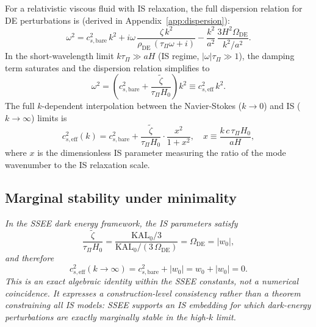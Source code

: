 \documentclass[12pt,a4paper]{article}
\newcommand{\KALz}{\mathrm{KAL}_0}
\newcommand{\wz}{w_0}
\newcommand{\OmDE}{\Omega_{\mathrm{DE}}}
\newcommand{\tauPi}{\tau_\Pi}
\newcommand{\ztilde}{\tilde{\zeta}}
\begin{document}
For a relativistic viscous fluid with IS relaxation, the full dispersion relation
for DE perturbations is (derived in Appendix~\ref{app:dispersion}):
\begin{equation}
  \omega^2 = c^2_{s,\mathrm{bare}}\,k^2
    + i\omega\,\frac{\zeta\,k^2}{\rho_{\mathrm{DE}}\,(\tauPi\omega + i)}
    - \frac{k^2}{a^2}\,\frac{3H^2\OmDE}{k^2/a^2}.
  \label{eq:disprel_full}
\end{equation}
In the short-wavelength limit $k\tauPi \gg aH$ (IS regime,
$|\omega|\tauPi \gg 1$), the damping term saturates and the dispersion relation
simplifies to
\begin{equation}
  \omega^2 = \left(c^2_{s,\mathrm{bare}} + \frac{\ztilde}{\tauPi H_0}\right)k^2
  \equiv c^2_{s,\mathrm{eff}}\,k^2.
  \label{eq:cs2_eff_def}
\end{equation}
The full $k$-dependent interpolation between the Navier-Stokes ($k\to 0$) and
IS ($k\to\infty$) limits is
\begin{equation}
  c^2_{s,\mathrm{eff}}(k) = c^2_{s,\mathrm{bare}}
  + \frac{\ztilde}{\tauPi H_0}\cdot\frac{x^2}{1+x^2},
  \quad x \equiv \frac{k\,c\,\tauPi H_0}{aH},
  \label{eq:cs2full}
\end{equation}
where $x$ is the dimensionless IS parameter measuring the ratio of the mode
wavenumber to the IS relaxation scale.

\subsection{Marginal stability under minimality}
\label{subsec:identity}

\begin{tcolorbox}[colback=blue!5!white,colframe=blue!60!black,title={\textbf{SSEE Marginal Stability (given minimality)}}]
\textit{In the SSEE dark energy framework, the IS parameters satisfy}
\begin{equation}
  \frac{\ztilde}{\tauPi H_0}
  = \frac{\KALz/3}{\KALz/(3\,\OmDE)}
  = \OmDE = |\wz|,
\end{equation}
\textit{and therefore}
\begin{equation}
  c^2_{s,\mathrm{eff}}(k\to\infty)
    = c^2_{s,\mathrm{bare}} + |\wz|
    = \wz + |\wz| = 0.
\end{equation}
\textit{This is an exact algebraic identity within the SSEE constants, not a
numerical coincidence. It expresses a construction-level consistency rather
than a theorem constraining all IS models: SSEE supports an IS embedding for
which dark-energy perturbations are exactly marginally stable in the
high-$k$ limit.}
\end{tcolorbox}
\end{document}
